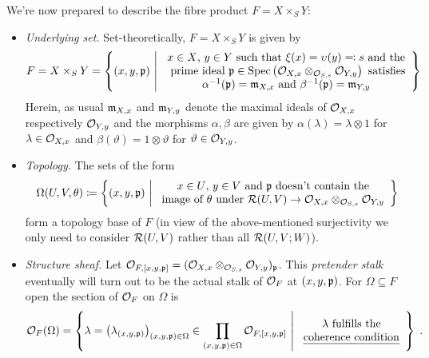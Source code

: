 \documentclass[a4paper,parskip=half,numbers=enddot, DIV=12]{scrreprt}
\begin{document}
We're now prepared to describe the fibre product $F=X\times_SY$:
\begin{itemize}
	\item \emph{Underlying set.} Set-theoretically, $F=X\times_SY$ is given by
	\begin{align*}
	F=X\times_S Y = \left\{(x,y,\mathfrak{p})\ \middle|\  
	\begin{array}{c}
		x\in X\text{, }y\in Y\text{ such that }\xi(x)=\upsilon(y)\eqqcolon s\text{ and the}\\
		\text{ prime ideal }\mathfrak{p}\in \operatorname{Spec}\left(\mathcal{O}_{X,x}\otimes_{\mathcal{O}_{S,s}}\mathcal{O}_{Y,y}\right)\text{ satisfies}\\
		\alpha^{-1}(\mathfrak{p}) = \mathfrak{m}_{X,x}\text{ and }\beta^{-1}(\mathfrak{p}) = \mathfrak{m}_{Y,y}
	\end{array}\right\}
	\end{align*}
	Herein, as usual $\mathfrak{m}_{X,x}$ and $\mathfrak{m}_{Y,y}$ denote the maximal ideals of $\mathcal{O}_{X,x}$ respectively $\mathcal{O}_{Y,y}$ and the morphisms $\alpha,\beta$ are given by $\alpha(\lambda)=\lambda\otimes 1$ for $\lambda\in\mathcal{O}_{X,x}$ and $\beta(\vartheta)=1\otimes\vartheta$ for $\vartheta\in\mathcal{O}_{Y,y}$.
	\item \emph{Topology.}
	The sets of the form
	\begin{align*}
		\Omega(U,V,\theta)\coloneqq\left\{(x,y,\pp)\st
		\begin{array}{c}
			x\in U\text{, }y\in V\text{ and }\pp\text{ doesn't contain the}\\
			\text{image of }\theta\text{ under }\Rr(U,V) \morphism \Oo_{X,x}\otimes_{\Oo_{S,s}} \Oo_{Y,y}
		\end{array}\right\}
	\end{align*}
	form a topology base of $F$ (in view of the above-mentioned surjectivity we only need to consider $\mathcal{R}(U,V)$ rather than all $\mathcal{R}(U,V;W)$).
	\item \emph{Structure sheaf.} Let $\mathcal{O}_{F,[x,y,\mathfrak{p}]} = (\mathcal{O}_{X,x}\otimes_{\mathcal{O}_{S,s}} \mathcal{O}_{Y,y})_{\mathfrak{p}}$. This \emph{pretender stalk} eventually will turn out to be the actual stalk of $\mathcal{O}_F$ at $(x,y,\mathfrak{p})$. For $\Omega\subseteq F$ open the section of $\mathcal{O}_F$ on $\Omega$ is
	\begin{align*}
		\mathcal{O}_F(\Omega)=\left\{\lambda=\left(\lambda_{(x,y,\mathfrak{p})}\right)_{(x,y,\mathfrak{p})\in\Omega}\in\prod_{(x,y,\mathfrak{p})\in\Omega}\mathcal{O}_{F,[x,y,\mathfrak{p}]}\ \middle|\ 
		\begin{array}{c}			
			\lambda\text{ fulfills the}\\
			\text{\emph{coherence condition}}
		\end{array}\right\}\;.
	\end{align*}

\end{itemize}
\end{document}
